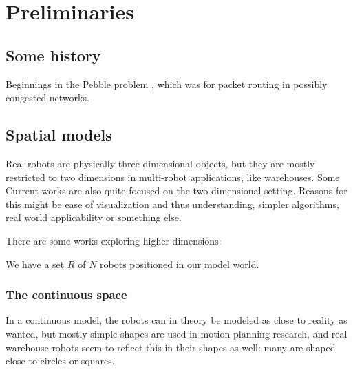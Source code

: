\section{Preliminaries}


\subsection{Some history}

Beginnings in the Pebble problem \cite{focs/KornhauserMS84}, which was for packet routing in possibly congested networks. 












\subsection{Spatial models}




Real robots are physically three-dimensional objects, but they are mostly restricted to two dimensions in multi-robot applications, like warehouses. 
Some 
Current works are also quite focused on the two-dimensional setting. 
Reasons for this might be ease of visualization and thus understanding, simpler algorithms, real world applicability or something else. 

There are some works exploring higher dimensions: \cite{arobots/TurpinMMK14}

We have a set $R$ of $N$ robots positioned in our model world.  





\subsubsection{The continuous space}

In a continuous model, the robots can in theory be modeled as close to reality as wanted, but mostly simple shapes are used in motion planning research, and real warehouse robots seem to reflect this in their shapes as well: many are shaped close to circles or squares. 

